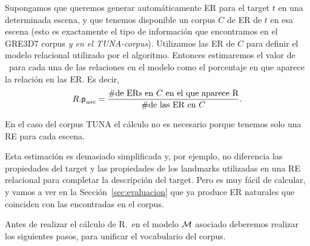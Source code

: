 Supongamos que queremos generar autom\'aticamente ER para el target $t$ en una
determinada escena, y que tenemos disponible un corpus $C$ de ER de $t$
en esa escena (esto es exactamente el tipo de informaci\'on que encontramos en el
GRE3D7 corpus \textit{y en el TUNA-corpus}). Utilizamos las ER de $C$
para definir el modelo relacional utilizado por el algoritmo. Entonces 
estimaremos el valor de \puse\ para cada una de las relaciones en el modelo como el
porcentaje en que aparece la relaci\'on en las ER. Es decir,
\begin{equation} \label{eq1}
R.\textsf{p}_\textit{use} = \frac {\#\mbox{de ERs en $C$ en el que aparece R}} {\#\mbox{de las ER en $C$}}.
\end{equation}

En el caso del corpus TUNA el c\'alculo no es necesario
porque tenemos solo una RE para cada escena.

Esta estimaci\'on es demasiado simplificada y, por ejemplo, no 
diferencia las propiedades del target y las propiedades de
los landmarks utilizadas en una RE relacional para completar la descripci\'on
del target. Pero es muy f\'acil de calcular, y vamos a ver
en la Secci\'on~\ref{sec:evaluacion} que ya produce ER naturales
que coinciden con las encontradas en el corpus.


Antes de realizar el c\'alculo de R.\puse \ en el modelo $\mathcal{M}$ asociado deberemos realizar los siguientes pasos, para unificar el vocabulario del corpus.


